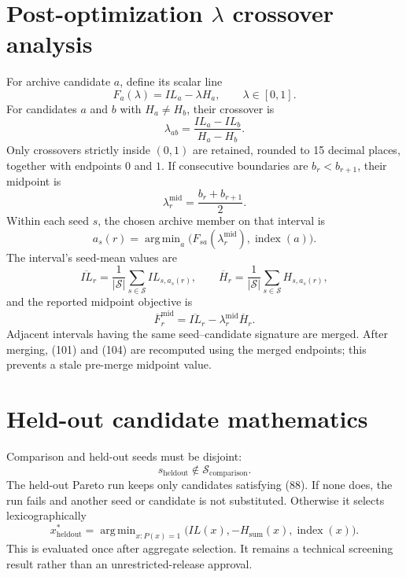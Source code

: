 \documentclass[11pt,a4paper]{article}
\newcommand{\card}[1]{\left\lvert #1\right\rvert}
\DeclareMathOperator*{\argmin}{arg\,min}
\begin{document}
\section{Post-optimization \texorpdfstring{$\lambda$}{lambda} crossover analysis}

For archive candidate $a$, define its scalar line
\begin{equation}
F_a(\lambda)=IL_a-\lambda H_a,
\qquad \lambda\in[0,1].
\tag{99}
\end{equation}
For candidates $a$ and $b$ with $H_a\ne H_b$, their crossover is
\begin{equation}
\lambda_{ab}=\frac{IL_a-IL_b}{H_a-H_b}.
\tag{100}
\end{equation}
Only crossovers strictly inside $(0,1)$ are retained, rounded to 15 decimal
places, together with endpoints $0$ and $1$.  If consecutive boundaries are
$b_r<b_{r+1}$, their midpoint is
\begin{equation}
\lambda_r^{\mathrm{mid}}=\frac{b_r+b_{r+1}}2.
\tag{101}
\end{equation}
Within each seed $s$, the chosen archive member on that interval is
\begin{equation}
a_s(r)=\argmin_a
\bigl(F_{sa}(\lambda_r^{\mathrm{mid}}),\operatorname{index}(a)\bigr).
\tag{102}
\end{equation}
The interval's seed-mean values are
\begin{equation}
\overline{IL}_r=\frac1{\card{\mathcal S}}
\sum_{s\in\mathcal S}IL_{s,a_s(r)},
\qquad
\overline H_r=\frac1{\card{\mathcal S}}
\sum_{s\in\mathcal S}H_{s,a_s(r)},
\tag{103}
\end{equation}
and the reported midpoint objective is
\begin{equation}
\overline F_r^{\mathrm{mid}}
=\overline{IL}_r-\lambda_r^{\mathrm{mid}}\overline H_r.
\tag{104}
\end{equation}
Adjacent intervals having the same seed--candidate signature are merged.
After merging, (101) and (104) are recomputed using the merged endpoints; this
prevents a stale pre-merge midpoint value.

\section{Held-out candidate mathematics}

Comparison and held-out seeds must be disjoint:
\begin{equation}
s_{\mathrm{heldout}}\notin\mathcal S_{\mathrm{comparison}}.
\tag{105}
\end{equation}
The held-out Pareto run keeps only candidates satisfying (88).  If none does,
the run fails and another seed or candidate is not substituted.  Otherwise it
selects lexicographically
\begin{equation}
x_{\mathrm{heldout}}^*
=\argmin_{x:P(x)=1}\bigl(IL(x),-H_{\mathrm{sum}}(x),\operatorname{index}(x)\bigr).
\tag{106}
\end{equation}
This is evaluated once after aggregate selection.  It remains a technical
screening result rather than an unrestricted-release approval.
\end{document}
